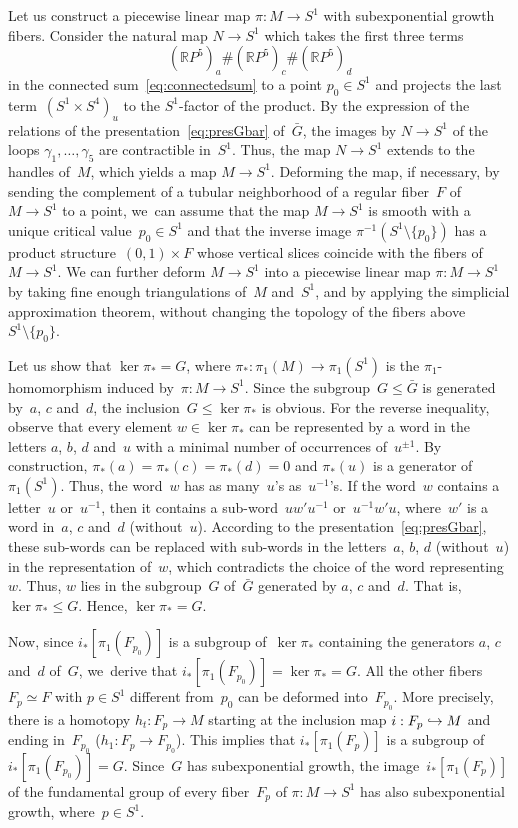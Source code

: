 \documentclass[JEP,XML,SOM,Unicode,NoFloatCountersInSection,published]{cedram}
\newcommand\hto{\mathrel{\lhook\joinrel\to}}
\theoremstyle{definition}
\newcommand\R{{\mathbb R}}
\begin{document}
Let us construct a piecewise linear map $\pi:M \to S^1$ with subexponential growth fibers.
Consider the natural map $N \to S^1$ which takes the first three terms
\[
(\R P^5)_a \# (\R P^5)_c \# (\R P^5)_d
\]
in the connected sum~\eqref{eq:connectedsum} to a point $p_0 \in S^1$ and projects the last term~$(S^1 \times S^4)_u$ to the $S^1$-factor of the product.
By the expression of the relations of the presentation~\eqref{eq:presGbar} of~$\bar{G}$, the images by $N \to S^1$ of the loops $\gamma_1,\dots,\gamma_5$ are contractible in~$S^1$.
Thus, the map $N \to S^1$ extends to the handles of~$M$, which yields a map $M \to S^1$.
Deforming the map, if necessary, by sending the complement of a tubular neighborhood of a regular fiber~$F$ of~$M \to S^1$ to a point, we~can assume that the map $M \to S^1$ is smooth with a unique critical value~$p_0 \in S^1$ and that the inverse image $\pi^{-1}(S^1 \setminus \{p_0\})$ has a product structure~$(0,1) \times F$ whose vertical slices coincide with the fibers of~$M \to S^1$.
We can further deform $M \to S^1$ into a piecewise linear map $\pi:M \to S^1$ by taking fine enough triangulations of~$M$ and~$S^1$, and by applying the simplicial approximation theorem, without changing the topology of the fibers above~$S^1 \setminus \{p_0\}$.

Let us show that $\ker \pi_* = G$, where $\pi_*:\pi_1(M) \to \pi_1(S^1)$ is the $\pi_1$-homomorphism induced by~$\pi:M \to S^1$.
Since the subgroup~$G \leqslant \bar{G}$ is generated by~$a$, $c$ and~$d$, the inclusion~$G \leqslant \ker \pi_*$ is obvious.
For the reverse inequality, observe that every element $w \in \ker \pi_*$ can be represented by a word in the letters $a$, $b$, $d$ and~$u$ with a minimal number of occurrences of~$u^{\pm 1}$.
By construction, $\pi_*(a) = \pi_*(c) = \pi_*(d) = 0$ and $\pi_*(u)$ is a generator of~$\pi_1(S^1)$.
Thus, the word~$w$ has as many~$u$'s as~$u^{-1}$'s.
If the word~$w$ contains a letter~$u$ or~$u^{-1}$, then it contains a sub-word~$uw'u^{-1}$ or~$u^{-1}w'u$, where~$w'$ is a word in~$a$, $c$ and~$d$ (without~$u$).
According to the presentation~\eqref{eq:presGbar}, these sub-words can be replaced with sub-words in the letters~$a$, $b$, $d$ (without~$u$) in the representation of~$w$, which contradicts the choice of the word representing~$w$.
Thus, $w$ lies in the subgroup~$G$ of~$\bar{G}$ generated by $a$, $c$ and~$d$.
That is, $\ker \pi_* \leqslant G$.
Hence, $\ker \pi_* =G$.

Now, since $i_*[\pi_1(F_{p_0})]$ is a subgroup of~$\ker \pi_*$ containing the generators $a$, $c$ and~$d$ of~$G$, we~derive that $i_*[\pi_1(F_{p_0})] = \ker \pi_* = G$.
All the other fibers~$F_p \simeq F$ with $p \in S^1$ different from~$p_0$ can be deformed into~$F_{p_0}$.
More precisely, there is a homotopy $h_t:F_p \to M$ starting at the inclusion map $i:F_p \hto M$ and ending in~$F_{p_0}$ \hbox{(\ie $h_1:F_p \to F_{p_0}$)}.
This implies that $i_*[\pi_1(F_p)]$ is a subgroup of~$i_*[\pi_1(F_{p_0})] = G$.
Since~$G$ has subexponential growth, the image~$i_*[\pi_1(F_p)]$ of the fundamental group of every fiber~$F_p$ of $\pi:M \to S^1$ has also subexponential growth, where~$p \in S^1$.
\end{document}
